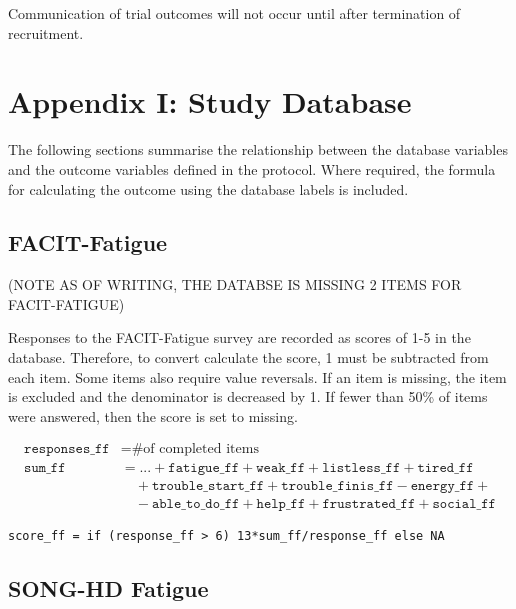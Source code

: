 \documentclass[
]{article}
\begin{document}
Communication of trial outcomes will not occur until after termination of recruitment.

\clearpage

\printbibliography[heading=bibintoc]

\clearpage

\hypertarget{study-database}{%
  \section{Appendix I: Study Database}\label{study-database}}

The following sections summarise the relationship between the database variables and the outcome variables defined in the protocol.
Where required, the formula for calculating the outcome using the database labels is included.

\subsection{FACIT-Fatigue}

(NOTE AS OF WRITING, THE DATABSE IS MISSING 2 ITEMS FOR FACIT-FATIGUE)

Responses to the FACIT-Fatigue survey are recorded as scores of 1-5 in the database.
Therefore, to convert calculate the score, 1 must be subtracted from each item.
Some items also require value reversals.
If an item is missing, the item is excluded and the denominator is decreased by 1.
If fewer than 50\% of items were answered, then the score is set to missing.

$$
\begin{aligned}
\texttt{responses\_ff} &= \text{\# of completed items}\\
\texttt{sum\_ff} &= ... + \texttt{fatigue\_ff} + \texttt{weak\_ff} + \texttt{listless\_ff} + \texttt{tired\_ff}\\
&\quad+\texttt{trouble\_start\_ff}+\texttt{trouble\_finis\_ff}-\texttt{energy\_ff}+ \\
&\quad-\texttt{able\_to\_do\_ff}+\texttt{help\_ff}+\texttt{frustrated\_ff}+\texttt{social\_ff}
\end{aligned}
$$

\begin{verbatim}
score_ff = if (response_ff > 6) 13*sum_ff/response_ff else NA
\end{verbatim}

\subsection{SONG-HD Fatigue}
\end{document}
